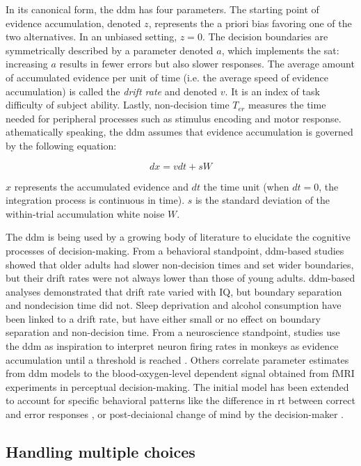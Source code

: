 In its canonical form, the \acrshort{ddm} has four parameters. The starting point of evidence accumulation, denoted $z$, represents the a priori bias favoring one of the two alternatives. In an unbiased setting, $z=0$. The decision boundaries are symmetrically described by a parameter denoted $a$, which implements the \acrlong{sat}: increasing $a$ results in fewer errors but also slower responses. The average amount of accumulated evidence per unit of time (i.e. the average speed of evidence accumulation) is called the \textit{drift rate} and denoted $v$. It is an index of task difficulty of subject ability. Lastly, non-decision time $T_{er}$ measures the time needed for peripheral processes such as stimulus encoding and motor response. athematically speaking, the \Acrshort{ddm} assumes that evidence accumulation is governed by the following equation:

$$dx = vdt + sW$$

$x$ represents the accumulated evidence and $dt$ the time unit (when $dt = 0$, the integration process is continuous in time). $s$ is the standard deviation of the within-trial accumulation white noise $W$.

The \acrlong{ddm} is being used by a growing body of literature to elucidate the cognitive processes of decision-making. From a behavioral standpoint, \Acrshort{ddm}-based studies showed that older adults had slower non-decision times and set wider boundaries, but their drift rates were not always lower than those of young adults. \Acrshort{ddm}-based analyses demonstrated that drift rate varied with IQ, but boundary separation and nondecision time did not. Sleep deprivation and alcohol consumption have been linked to a drift rate, but have either small or no effect on boundary separation and non-decision time. From a neuroscience standpoint, studies use the \acrshort{ddm} as inspiration to interpret neuron firing rates in monkeys as evidence accumulation until a threshold is reached \cite{GOLD200110}. Others correlate parameter estimates from \Acrshort{ddm} models to the blood-oxygen-level dependent signal obtained from fMRI experiments in perceptual decision-making. The initial model has been extended to account for specific behavioral patterns like the difference in \acrlong{rt} between correct and error responses \cite{ratcliffDiffusionDecisionModel2008}, or post-deciaional change of mind by the decision-maker \cite{resulajChangesMindDecisionmaking2009}.

\subsection{Handling multiple choices}

